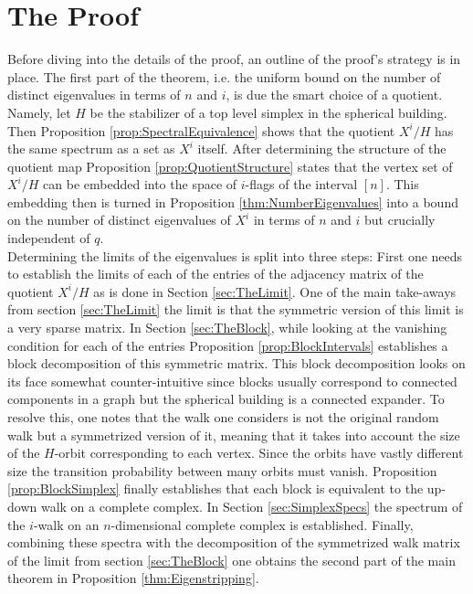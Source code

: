 \documentclass[11pt]{amsart}
\begin{document}
    
    \section{The Proof}
    Before diving into the details of the proof, an outline of the proof's strategy is in place. The first part of the theorem, i.e. the uniform bound on the number of distinct eigenvalues in terms of $n$ and $i$, is due the smart choice of a quotient. Namely, let $H$ be the stabilizer of a top level simplex in the spherical building. Then Proposition \ref{prop:SpectralEquivalence} shows that the quotient $X^i/H$ has the same spectrum as a set as $X^i$ itself. After determining the structure of the quotient map Proposition \ref{prop:QuotientStructure} states that the vertex set of $X^i/H$ can be embedded into the space of $i$-flags of the interval $[n]$. This embedding then is turned in Proposition \ref{thm:NumberEigenvalues} into a bound on the number of distinct eigenvalues of $X^i$ in terms of $n$ and $i$ but crucially independent of $q$.\\
    Determining the limits of the eigenvalues is split into three steps: First one needs to establish the limits of each of the entries of the adjacency matrix of the quotient $X^i/H$ as is done in Section \ref{sec:TheLimit}. One of the main take-aways from section \ref{sec:TheLimit} the limit is that the symmetric version of this limit is a very sparse matrix. In Section \ref{sec:TheBlock}, while looking at the vanishing condition for each of the entries Proposition \ref{prop:BlockIntervals} establishes a block decomposition of this symmetric matrix. This block decomposition looks on its face somewhat counter-intuitive since blocks usually correspond to connected components in a graph but the spherical building is a connected expander. To resolve this, one notes that the walk one considers is not the original random walk but a symmetrized version of it, meaning that it takes into account the size of the $H$-orbit corresponding to each vertex. Since the orbits have vastly different size the transition probability between many orbits must vanish. Proposition \ref{prop:BlockSimplex} finally establishes that each block is equivalent to the up-down walk on a complete complex. In Section \ref{sec:SimplexSpecs} the spectrum of the $i$-walk on an $n$-dimensional complete complex is established. Finally, combining these spectra with the decomposition of the symmetrized walk matrix of the limit from section \ref{sec:TheBlock} one obtains the second part of the main theorem in Proposition \ref{thm:Eigenstripping}.
\end{document}

